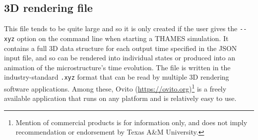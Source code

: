 \documentclass{article}
\begin{document}
\subsection{3D rendering file}
This file tends to be quite large and so it is only created if the user gives
the \verb!--xyz! option on the command line when starting a THAMES simulation.
It contains a full 3D data structure for each output time specified in the JSON
input file, and so can be rendered into individual states or produced into
an animation of the microstructure's time evolution. The file is written
in the industry-standard \verb!.xyz! format that can be read by multiple
3D rendering software applications. Among these,
Ovito (\url{https://ovito.org})\footnote{Mention of commercial products is
	for information only, and does not imply recommendation or endorsement by Texas A\&M University.}
is a freely available application that runs on any platform and is relatively easy to use.
\end{document}
